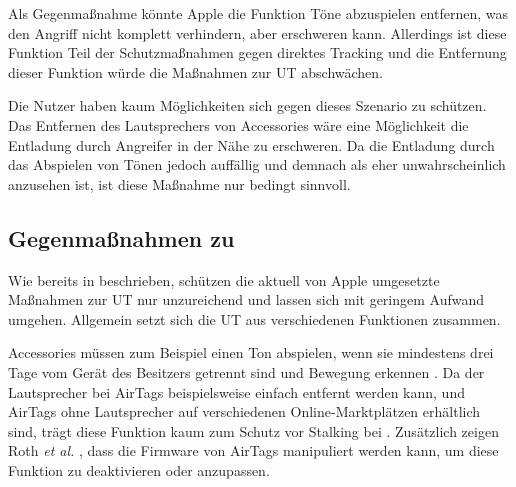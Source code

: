 Als Gegenmaßnahme könnte Apple die Funktion Töne abzuspielen entfernen, was den Angriff nicht komplett verhindern, aber erschweren kann.
Allerdings ist diese Funktion Teil der Schutzmaßnahmen gegen direktes Tracking und die Entfernung dieser Funktion würde die Maßnahmen zur \ac{UT} abschwächen.

Die Nutzer haben kaum Möglichkeiten sich gegen dieses Szenario zu schützen. 
Das Entfernen des Lautsprechers von Accessories wäre eine Möglichkeit die Entladung durch Angreifer in der Nähe zu erschweren.
Da die Entladung durch das Abspielen von Tönen jedoch auffällig und demnach als eher unwahrscheinlich anzusehen ist, ist diese Maßnahme nur bedingt sinnvoll.


\subsection{Gegenmaßnahmen zu }
\label{sec:gegenmassnahmen:3}

Wie bereits in  beschrieben, schützen die aktuell von Apple umgesetzte Maßnahmen zur \acl*{UT} nur unzureichend und lassen sich mit geringem Aufwand umgehen.
Allgemein setzt sich die \ac{UT} aus verschiedenen Funktionen zusammen.

Accessories müssen zum Beispiel einen Ton abspielen, wenn sie mindestens drei Tage vom Gerät des Besitzers getrennt sind und Bewegung erkennen \cite{Apple_FindMySpec}.
Da der Lautsprecher bei AirTags beispielsweise einfach entfernt werden kann, und AirTags ohne Lautsprecher auf verschiedenen Online-Marktplätzen erhältlich sind, trägt diese Funktion kaum zum Schutz vor Stalking bei \cite{Heinrich_AirGuard}.
Zusätzlich zeigen Roth \textit{et al.} \cite{Roth_airtags}, dass die Firmware von AirTags manipuliert werden kann, um diese Funktion zu deaktivieren oder anzupassen.

